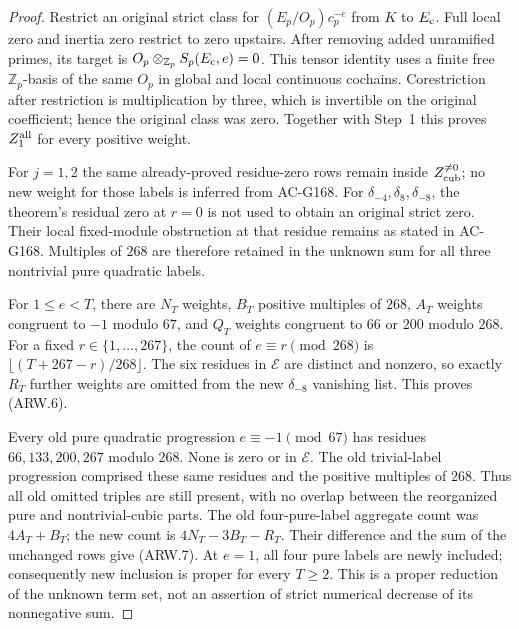 \begin{proof}
Restrict an original strict class for $(E_p/O_p)c_p^{-e}$
from $K$ to $E_{\rm c}$.
Full local zero and inertia zero restrict to zero upstairs.
After removing added unramified primes, its target is
$O_p\otimes_{\mathbb Z_p}S_p(E_{\rm c},e)=0$.
This tensor identity uses a finite free $\mathbb Z_p$-basis
of the same $O_p$ in global and local continuous cochains.
Corestriction after restriction is multiplication by three,
which is invertible on the original coefficient; hence the
original class was zero.  Together with Step~1 this proves
$Z_1^{\rm all}$ for every positive weight.

For $j=1,2$ the same already-proved residue-zero rows remain
inside $Z_{\rm cub}^{\ne0}$; no new weight for those labels
is inferred from AC-G168.
For $\delta_{-4},\delta_8,\delta_{-8}$, the theorem's residual
zero at $r=0$ is not used to obtain an original strict zero.
Their local fixed-module obstruction at that residue remains
as stated in AC-G168.  Multiples of $268$ are therefore retained
in the unknown sum for all three nontrivial pure quadratic labels.

For $1\leq e<T$, there are $N_T$ weights, $B_T$ positive
multiples of $268$, $A_T$ weights congruent to $-1$ modulo $67$,
and $Q_T$ weights congruent to $66$ or $200$ modulo $268$.
For a fixed $r\in\{1,\ldots,267\}$, the count of
$e\equiv r\pmod{268}$ is $\lfloor(T+267-r)/268\rfloor$.
The six residues in $\mathcal E$ are distinct and nonzero,
so exactly $R_T$ further weights are omitted from the new
$\delta_{-8}$ vanishing list.  This proves (ARW.6).

Every old pure quadratic progression $e\equiv-1\pmod{67}$
has residues $66,133,200,267$ modulo $268$.
None is zero or in $\mathcal E$.
The old trivial-label progression comprised these same residues
and the positive multiples of $268$.
Thus all old omitted triples are still present, with no overlap
between the reorganized pure and nontrivial-cubic parts.
The old four-pure-label aggregate count was $4A_T+B_T$;
the new count is $4N_T-3B_T-R_T$.
Their difference and the sum of the unchanged rows give (ARW.7).
At $e=1$, all four pure labels are newly included; consequently
new inclusion is proper for every $T\geq2$.
This is a proper reduction of the unknown term set, not an
assertion of strict numerical decrease of its nonnegative sum.


\end{proof}
